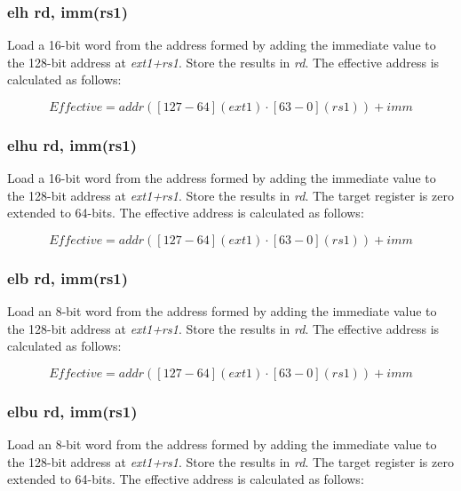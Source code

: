 \documentclass{article}
\begin{document}
\subsubsection{elh rd, imm(rs1)}
Load a 16-bit word from the address formed by adding the immediate value to the 
128-bit address at \textit{ext1+rs1}.  Store the results in \textit{rd}.  The effective 
address is calculated as follows: 

\begin{equation}
Effective = addr([127-64](ext1) \cdot [63-0](rs1))+imm
\end{equation}

\subsubsection{elhu rd, imm(rs1)}
Load a 16-bit word from the address formed by adding the immediate value to the 
128-bit address at \textit{ext1+rs1}.  Store the results in \textit{rd}.  
 The target register is zero extended to 64-bits.  The effective 
address is calculated as follows: 

\begin{equation}
Effective = addr([127-64](ext1) \cdot [63-0](rs1))+imm
\end{equation}

\subsubsection{elb rd, imm(rs1)}
Load an 8-bit word from the address formed by adding the immediate value to the 
128-bit address at \textit{ext1+rs1}.  Store the results in \textit{rd}.  The effective 
address is calculated as follows: 

\begin{equation}
Effective = addr([127-64](ext1) \cdot [63-0](rs1))+imm
\end{equation}

\subsubsection{elbu rd, imm(rs1)}
Load an 8-bit word from the address formed by adding the immediate value to the 
128-bit address at \textit{ext1+rs1}.  Store the results in \textit{rd}.  
 The target register is zero extended to 64-bits.  The effective 
address is calculated as follows: 
\end{document}
